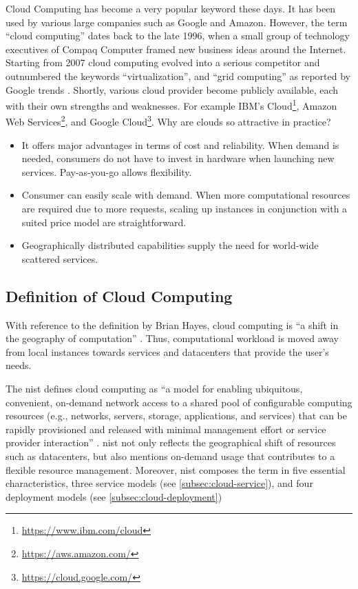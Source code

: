 Cloud Computing has become a very popular keyword these days. 
It has been used by various large companies such as Google and Amazon.
However, the term \enquote{cloud computing} dates back to the late 1996, when a small group of technology executives of Compaq Computer framed new business ideas around the Internet.\cite{regalado2020}
Starting from 2007 cloud computing evolved into a serious competitor and outnumbered the keywords \enquote{virtualization}, and \enquote{grid computing} as reported by Google trends \cite{Wang2010}.
Shortly, various cloud provider become publicly available, each with their own strengths and weaknesses.
For example IBM's Cloud\footnote{\url{https://www.ibm.com/cloud}}, Amazon Web Services\footnote{\url{https://aws.amazon.com/}}, and Google Cloud\footnote{\url{https://cloud.google.com/}}.
Why are clouds so attractive in practice?

\begin{itemize}
    \item It offers major advantages in terms of cost and reliability.
    When demand is needed, consumers do not have to invest in hardware when launching new services.
    Pay-as-you-go allows flexibility.
    \item Consumer can easily scale with demand.
    When more computational resources are required due to more requests, scaling up instances in conjunction with a suited price model are straightforward.
    \item Geographically distributed capabilities supply the need for world-wide scattered services.
\end{itemize}

\subsection{Definition of Cloud Computing}

With reference to the definition by Brian Hayes, cloud computing is \enquote{a shift in the geography of computation} \cite{hayes2008}.
Thus, computational workload is moved away from local instances towards services and datacenters that provide the user's needs\cite{Armbrust2010}.

The \ac{nist} defines cloud computing as \enquote{a model for enabling ubiquitous, convenient, on-demand network access to a shared pool of configurable computing resources (e.g., networks, servers, storage, applications, and services) that can be rapidly provisioned and released with minimal management effort or service provider interaction} \cite{Mell2011}.
\ac{nist} not only reflects the geographical shift of resources such as datacenters, but also mentions on-demand usage that contributes to a flexible resource management.
Moreover, \ac{nist} composes the term in five essential characteristics, three service models (see \autoref{subsec:cloud-service}), and four deployment models (see \autoref{subsec:cloud-deployment}) \cite{Mell2011}

